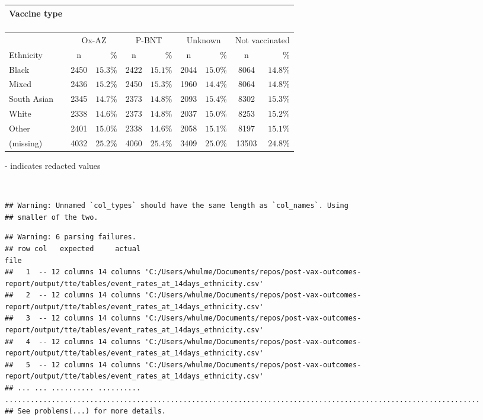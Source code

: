 \documentclass[
]{article}
\begin{document}
\captionsetup[table]{labelformat=empty,skip=1pt}
\begin{longtable}{lcrcrcrcr}
\caption*{
\large Vaccine type\\ 
\small \\ 
} \\ 
\toprule
& \multicolumn{2}{c}{Ox-AZ} & \multicolumn{2}{c}{P-BNT} & \multicolumn{2}{c}{Unknown} & \multicolumn{2}{c}{Not vaccinated} \\ 
 \cmidrule(lr){2-3}\cmidrule(lr){4-5}\cmidrule(lr){6-7}\cmidrule(lr){8-9}
Ethnicity & n & \% & n & \% & n & \% & n & \% \\ 
\midrule
Black & 2450 & $15.3\%$ & 2422 & $15.1\%$ & 2044 & $15.0\%$ & 8064 & $14.8\%$ \\ 
Mixed & 2436 & $15.2\%$ & 2450 & $15.3\%$ & 1960 & $14.4\%$ & 8064 & $14.8\%$ \\ 
South Asian & 2345 & $14.7\%$ & 2373 & $14.8\%$ & 2093 & $15.4\%$ & 8302 & $15.3\%$ \\ 
White & 2338 & $14.6\%$ & 2373 & $14.8\%$ & 2037 & $15.0\%$ & 8253 & $15.2\%$ \\ 
Other & 2401 & $15.0\%$ & 2338 & $14.6\%$ & 2058 & $15.1\%$ & 8197 & $15.1\%$ \\ 
(missing) & 4032 & $25.2\%$ & 4060 & $25.4\%$ & 3409 & $25.0\%$ & 13503 & $24.8\%$ \\ 
\bottomrule
\end{longtable}
\begin{minipage}{\linewidth}
- indicates redacted values\\ 
\end{minipage}

~ ~

\begin{verbatim}
## Warning: Unnamed `col_types` should have the same length as `col_names`. Using
## smaller of the two.
\end{verbatim}

\begin{verbatim}
## Warning: 6 parsing failures.
## row col   expected     actual                                                                                                             file
##   1  -- 12 columns 14 columns 'C:/Users/whulme/Documents/repos/post-vax-outcomes-report/output/tte/tables/event_rates_at_14days_ethnicity.csv'
##   2  -- 12 columns 14 columns 'C:/Users/whulme/Documents/repos/post-vax-outcomes-report/output/tte/tables/event_rates_at_14days_ethnicity.csv'
##   3  -- 12 columns 14 columns 'C:/Users/whulme/Documents/repos/post-vax-outcomes-report/output/tte/tables/event_rates_at_14days_ethnicity.csv'
##   4  -- 12 columns 14 columns 'C:/Users/whulme/Documents/repos/post-vax-outcomes-report/output/tte/tables/event_rates_at_14days_ethnicity.csv'
##   5  -- 12 columns 14 columns 'C:/Users/whulme/Documents/repos/post-vax-outcomes-report/output/tte/tables/event_rates_at_14days_ethnicity.csv'
## ... ... .......... .......... ................................................................................................................
## See problems(...) for more details.
\end{verbatim}
\end{document}
